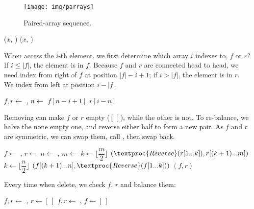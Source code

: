 \documentclass[b5paper]{article}
\begin{document}
\begin{figure}[htbp]
  \centering
  \texttt{[image: img/parrays]}
  \caption{Paired-array sequence.}
  \label{fig:parrays}
\end{figure}

\begin{algorithmic}[1]
  \State {}($x$, )
\EndFunction
{}
  \State {}($x$, )
\EndFunction
\end{algorithmic}


When access the $i$-th element, we first determine which array $i$ indexes to, $f$ or $r$? If $ i \leq |f|$, the element is in $f$. Because $f$ and $r$ are connected head to head, we need index from right of $f$ at position $|f| - i + 1$; if $i > |f|$, the element is in $r$. We index from left at position $i - |f|$.

\begin{algorithmic}[1]
  \State $f, r \gets $ , 
  \State $n \gets $ 
    \State \Return $f[n - i + 1]$ 
  \Else
    \State \Return $r[i - n]$
  \EndIf
\EndFunction
\end{algorithmic}

Removing can make $f$ or $r$ empty ($[\ ]$), while the other is not. To re-balance, we halve the none empty one, and reverse either half to form a new pair. As $f$ and $r$ are symmetric, we can swap them, call , then swap back.

\begin{algorithmic}[1]
  \State $f \gets$ , $r \gets$ 
  \State $n \gets$ , $m \gets$ 
    \State $k \gets \lfloor \dfrac{m}{2} \rfloor$
    \State \Return $(\textproc{Reverse}(r[1 ... k]), r[(k + 1) ... m])$
  \EndIf
    \State $k \gets \lfloor \dfrac{n}{2} \rfloor$
    \State \Return $(f[(k + 1) ... n], \textproc{Reverse}(f[1 ... k]))$
  \EndIf
  \State \Return $(f, r)$
\EndFunction
\end{algorithmic}

Every time when delete, we check $f$, $r$ and balance them:

\begin{algorithmic}[1]
  \State {}
  \State $f, r \gets$ , 
   
    \State $r \gets [\ ]$
  \Else
    \State {}
  \EndIf
\EndFunction
\Statex
{}
  \State {}
  \State $f, r \gets$ , 
   
    \State $f \gets [\ ]$
  \Else
    \State {}
  \EndIf
\EndFunction
\end{algorithmic}
\end{document}
